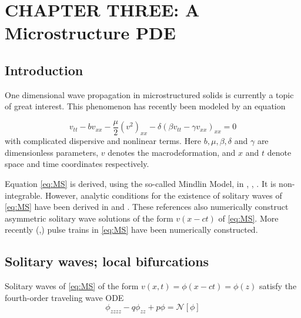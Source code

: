 \chapter{CHAPTER THREE: A Microstructure PDE } \label{chapter_3}

\section{Introduction}

One dimensional wave propagation in microstructured solids is currently a topic of great interest.
This phenomenon has recently been modeled \cite{STE} by an equation

\begin{equation}\label{eq:MS}
v_{tt} - b v_{xx} - \frac{\mu}{2} \left( v^2 \right)_{xx} - \delta \left( \beta v_{tt} - \gamma v_{xx}\right)_{xx} = 0 
\end{equation}
with complicated dispersive and nonlinear terms. Here $b, \mu, \beta, \delta$
and $\gamma$ are dimensionless parameters, $v$ denotes the macrodeformation,
and $x$ and $t$ denote space and time coordinates respectively.

Equation \eqref{eq:MS} is derived, using the so-called Mindlin Model, in
\cite{STE}, \cite{JE1}, \cite{JE2}.  It is non-integrable. However, analytic
conditions for the existence of solitary waves of \eqref{eq:MS} have been
derived in \cite{JE2} and \cite{STE}. These references also numerically
construct asymmetric solitary wave solutions of the form $ v\left(x - c t
\right)$ of \eqref{eq:MS}.  More recently (\cite{EP},\cite{EBS}) pulse trains
in \eqref{eq:MS} have been numerically constructed.

\section{Solitary waves; local bifurcations}


Solitary waves of \eqref{eq:MS} of the form 
$v(x,t) = \phi\left(x - c t\right) = \phi\left(z\right)$
 satisfy the fourth-order traveling wave ODE
\begin{equation} \label{eq:ode2} \phi_{zzzz} - q \phi_{zz} + p \phi = \mathcal{N}[\phi]
\end{equation}

